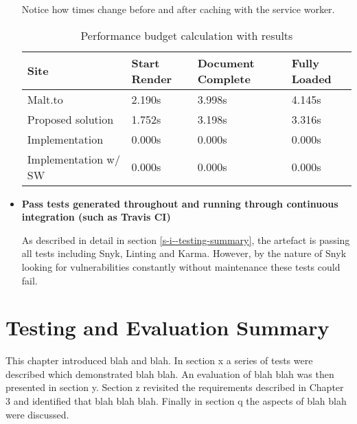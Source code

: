 \begin{itemize}
    Notice how times change before and after caching with the service worker.

    \begin{table}[H]
    \centering
    \begin{tabular}{|l|l|l|l|}
    \hline
    \textbf{Site}     & \textbf{Start Render} & \textbf{Document Complete} & \textbf{Fully Loaded} \\ \hline
    Malt.to           & 2.190s                & 3.998s                     & 4.145s                \\ \hline
    Proposed solution & 1.752s                & 3.198s                     & 3.316s                \\ \hline
    Implementation & 0.000s                & 0.000s                     & 0.000s                \\ \hline
    Implementation w/ SW & 0.000s                & 0.000s                     & 0.000s                \\ \hline
    \end{tabular}
    \caption{Performance budget calculation with results}
    \label{table-performance-budget-results}
    \end{table}

  \item \textbf{Pass tests generated throughout and running through continuous integration (such as Travis CI)}

    As described in detail in section \ref{s-i--testing-summary}, the artefact is passing all tests including Snyk, Linting and Karma. However, by the nature of Snyk looking for vulnerabilities constantly without maintenance these tests could fail.

\end{itemize}

\section{Testing and Evaluation Summary} \label{s-i--testing-and-evaluation-summary}

This chapter introduced blah and blah.  In section x a series of tests were described which demonstrated blah blah.
An evaluation of blah blah was then presented in section y.  Section z revisited the requirements described in Chapter 3 and identified that blah blah blah. Finally in section q the aspects of blah blah were discussed.
